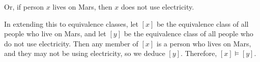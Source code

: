 \begin{Answer}
  \step
  Or, if person $x$ lives on Mars,
  then $x$ does not use electricity.

  \step
  In extending this to equivalence classes,
  let $[x]$ be the equivalence class of all people who live on Mars,
  and let $[y]$ be the equivalence class of all people who do not use electricity.
  Then any member of $[x]$ is a person who lives on Mars,
  and they may not be using electricity, so we deduce $[y]$.
  Therefore, $[x] \models [y]$.
\end{Answer}
